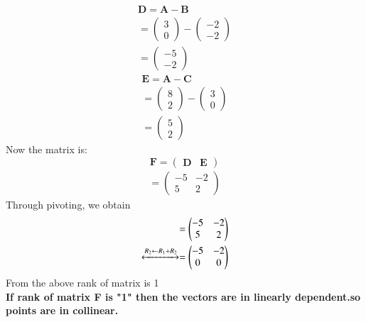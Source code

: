 \documentclass[10pt, a4paper]{article}
\newcommand{\myvec}[1]{\ensuremath{\begin{pmatrix}#1\end{pmatrix}}}
\let\vec\mathbf
\begin{document}
\begin{align}
	  \vec{D}= \vec{A}- \vec{B}
	  \\
	  = {\myvec{ 3 \\ 0}-\myvec{-2 \\ -2}}
	  \\
	  =\myvec{-5 \\ -2}
 \end{align}
  \begin{align}
	  \vec{E}= \vec{A}- \vec{C}
	  \\
	  ={\myvec{ 8 \\ 2}-\myvec{3 \\ 0}}
	  \\
	  =\myvec{ 5 \\ 2}
  \end{align}
   Now the matrix is:
\begin{equation}
\boldsymbol{F}=
\begin{pmatrix}
 
     \boldsymbol{D} & \boldsymbol{E}
 \end{pmatrix}
 \end{equation}
 \begin{align}
			   = \myvec{-5 & -2
			    \\
			    5 & 2 }  
		    \end{align}
		    Through pivoting, we obtain 
		    \begin{align}
			   = \myvec{-5 & -2  
			    \\
			    5 & 2 }  
			    \\
			    \xleftrightarrow[]{R_2 \leftarrow {R_1 + R_2}}
			   = \myvec{	    -5 & -2  
			    \\
			    0 & 0}  
\end{align}
\textbf{}From the above rank of matrix is 1
\\
\textbf{If rank of matrix F is "1"  then the vectors  are in linearly dependent.so points are in collinear.} 
  
\end{document}

